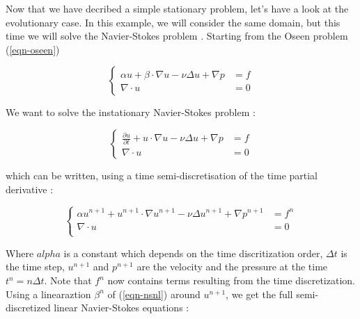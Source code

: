 %
%
%
%
%


Now that we have decribed a simple stationary problem, let's have a look at the evolutionary
case. In this example, we will consider the same domain, but this time we will solve the
Navier-Stokes problem . Starting from the Oseen problem (\ref{eqn-oseen})

\begin{equation*}
\left\{
\begin{array}{rl}
\displaystyle \alpha u + \beta \cdot \nabla u - \nu \Delta u+
\nabla p & = f \\
\displaystyle \nabla \cdot u & = 0
\end{array}
\right.
\end{equation*}

We want to solve the instationary Navier-Stokes problem :

\begin{equation*} \label{eqn-navierstokes}
\left\{
\begin{array}{rl}
\displaystyle \frac{\partial u}{\partial t} + u \cdot \nabla u - \nu \Delta u+
\nabla p & = f \\
\displaystyle \nabla \cdot u & = 0
\end{array}
\right.
\end{equation*}

which can be written, using a time semi-discretisation of the time partial derivative :

\begin{equation*} \label{eqn-nsnl}
\left\{
\begin{array}{rl}
\displaystyle \alpha u^{n+1} + u^{n+1} \cdot \nabla u^{n+1} - \nu \Delta u^{n+1}+
\nabla p^{n+1} & = f^n  \\
\displaystyle \nabla \cdot u & = 0  \\
\end{array}
\right.
\end{equation*}

Where $alpha$ is a constant which depends on the time discritization order, $\Delta t$ is the time step, $u^{n+1}$ and $p^{n+1}$ are the velocity and the pressure at the time $t^n = n\Delta t$.
Note that $f^n$ now contains terms resulting from the time discretization.
Using a linearaztion $\beta^n$ of (\ref{eqn-nsnl}) around $u^{n+1}$, we get the full semi-discretized linear Navier-Stokes
equations :


